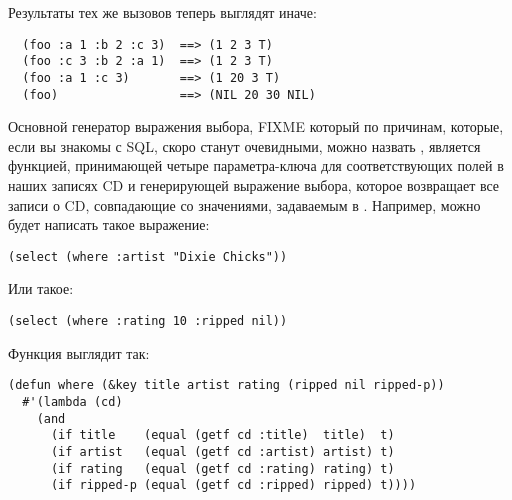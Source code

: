Результаты тех же вызовов теперь выглядят иначе:

\begin{verbatim}
  (foo :a 1 :b 2 :c 3)  ==> (1 2 3 T)
  (foo :c 3 :b 2 :a 1)  ==> (1 2 3 T)
  (foo :a 1 :c 3)       ==> (1 20 3 T)
  (foo)                 ==> (NIL 20 30 NIL)
\end{verbatim}

Основной генератор выражения выбора, FIXME который по причинам, которые, если вы знакомы с
SQL, скоро станут очевидными, можно назвать , является функцией, принимающей
четыре параметра-ключа для соответствующих полей в наших записях CD и генерирующей
выражение выбора, которое возвращает все записи о CD, совпадающие со значениями,
задаваемым в . Например, можно будет написать такое выражение:

\begin{lstlisting}
(select (where :artist "Dixie Chicks"))
\end{lstlisting}

Или такое:

\begin{lstlisting}
(select (where :rating 10 :ripped nil))
\end{lstlisting}

Функция выглядит так:

\begin{lstlisting}
(defun where (&key title artist rating (ripped nil ripped-p))
  #'(lambda (cd)
    (and
      (if title    (equal (getf cd :title)  title)  t)
      (if artist   (equal (getf cd :artist) artist) t)
      (if rating   (equal (getf cd :rating) rating) t)
      (if ripped-p (equal (getf cd :ripped) ripped) t))))
\end{lstlisting}

